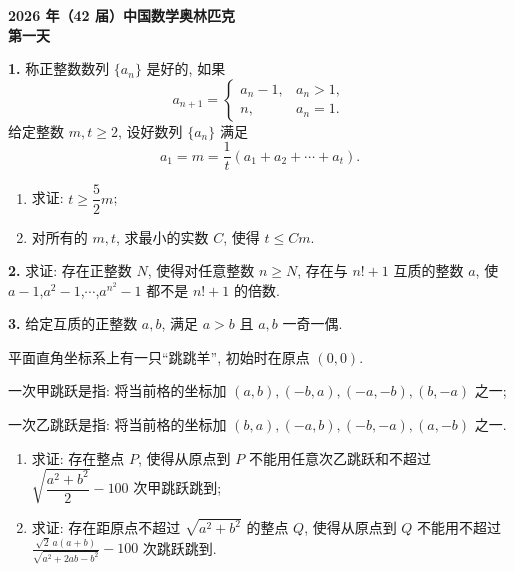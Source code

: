 \documentclass[11pt,a4paper]{ctexart}
\begin{document}
\begin{center}
  {\Large\bfseries 2026 年（42 届）中国数学奥林匹克}\\[6pt]
  {\Large\bfseries 第一天}
\end{center}

\vspace{1em}

\noindent\textbf{1.}\; 称正整数数列 \(\{a_n\}\) 是好的, 如果
\[
  a_{n+1}=
  \begin{cases}
    a_n-1, & a_n>1,\\[2pt]
    n, & a_n=1.
  \end{cases}
\]
给定整数 \(m,t\ge 2\), 设好数列 \(\{a_n\}\) 满足
\[
  a_1=m=\frac{1}{t}\left(a_1+a_2+\cdots+a_t\right).
\]
\begin{enumerate}[label=(\arabic*),leftmargin=2.2em,itemsep=0.2em,topsep=0.4em]
  \item 求证: \(t\ge \dfrac{5}{2}m\);
  \item 对所有的 \(m,t\), 求最小的实数 \(C\), 使得 \(t\le Cm\).
\end{enumerate}

\vspace{1.6em}

\noindent\textbf{2.}\; 求证: 存在正整数 \(N\), 使得对任意整数 \(n\ge N\), 存在与 \(n!+1\) 互质的整数 \(a\), 使
\mbox{\(a-1\)},\mbox{\(a^2-1\)},\mbox{\(\cdots\)},\mbox{\(a^{n^2}-1\)} 都不是 \(n!+1\) 的倍数.

\vspace{1.6em}

\noindent\textbf{3.}\; 给定互质的正整数 \(a,b\), 满足 \(a>b\) 且 \(a,b\) 一奇一偶.

平面直角坐标系上有一只“跳跳羊”, 初始时在原点 \((0,0)\).

一次甲跳跃是指: 将当前格的坐标加 \((a,b),(-b,a),(-a,-b),(b,-a)\) 之一;

一次乙跳跃是指: 将当前格的坐标加 \((b,a),(-a,b),(-b,-a),(a,-b)\) 之一.

\begin{enumerate}[label=(\arabic*),leftmargin=2.2em,itemsep=0.6em,topsep=0.4em]
  \item 求证: 存在整点 \(P\), 使得从原点到 \(P\) 不能用任意次乙跳跃和不超过
        \(\sqrt{\dfrac{a^2+b^2}{2}}-100\) 次甲跳跃跳到;
  \item 求证: 存在距原点不超过 \(\sqrt{a^2+b^2}\) 的整点 \(Q\), 使得从原点到 \(Q\) 不能用不超过\hfill\break
        \(\frac{\sqrt{2}\,a(a+b)}{\sqrt{a^2+2ab-b^2}}-100\) 次跳跃跳到.
\end{enumerate}
\end{document}
